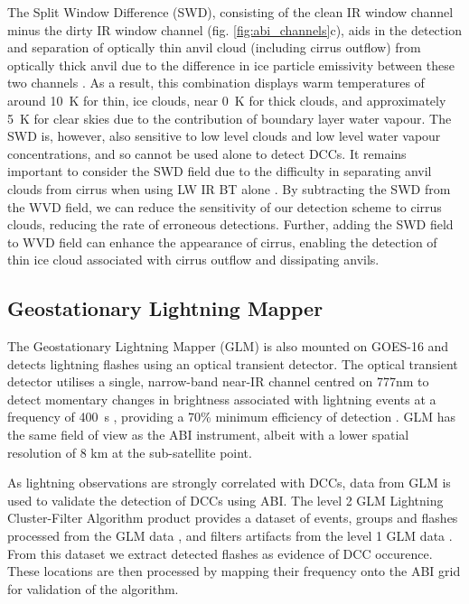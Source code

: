 The Split Window Difference (SWD), consisting of the clean IR window channel minus the dirty IR window channel (fig. \ref{fig:abi_channels}c), aids in the detection and separation of optically thin anvil cloud (including cirrus outflow) from optically thick anvil due to the difference in ice particle emissivity between these two channels \citep{heidinger_gazing_2009}.
As a result, this combination displays warm temperatures of around 10~\unit{K} for thin, ice clouds, near 0~\unit{K} for thick clouds, and approximately 5~\unit{K} for clear skies due to the contribution of boundary layer water vapour.
The SWD is, however, also sensitive to low level clouds and low level water vapour concentrations, and so cannot be used alone to detect DCCs.
It remains important to consider the SWD field due to the difficulty in separating anvil clouds from cirrus when using LW IR BT alone \citep{hong_detection_2005}. 
By subtracting the SWD from the WVD field, we can reduce the sensitivity of our detection scheme to cirrus clouds, reducing the rate of erroneous detections.
Further, adding the SWD field to WVD field can enhance the appearance of cirrus, enabling the detection of thin ice cloud associated with cirrus outflow and dissipating anvils.


\subsection{Geostationary Lightning Mapper}

The Geostationary Lightning Mapper (GLM) is also mounted on GOES-16 and detects lightning flashes using an optical transient detector.
The optical transient detector utilises a single, narrow-band near-IR channel centred on 777\unit{nm} \citep{orville_absolute_1984} to detect momentary changes in brightness associated with lightning events at a frequency of 400\unit{\mu s} \citep{christian_global_2003}, providing a 70\% minimum efficiency of detection \citep{goodman_goes-r_2013}.
GLM has the same field of view as the ABI instrument, albeit with a lower spatial resolution of 8 \unit{km} at the sub-satellite point.

As lightning observations are strongly correlated with DCCs, data from GLM is used to validate the detection of DCCs using ABI.
The level 2 GLM Lightning Cluster-Filter Algorithm product provides a dataset of events, groups and flashes processed from the GLM data \citep{peterson_research_2019}, and filters artifacts from the level 1 GLM data \citep{peterson_removing_2020}.
From this dataset we extract detected flashes as evidence of DCC occurence.
These locations are then processed by mapping their frequency onto the ABI grid for validation of the algorithm.

